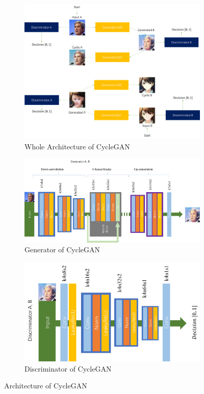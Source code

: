 \documentclass[10pt,twocolumn,letterpaper]{article}
\begin{document}
\begin{figure}[h]
   \centering
   \begin{subfigure}{.32\linewidth}
      \centering
      \includegraphics[width=.9\linewidth]{cyclegan-arch}
      \caption{Whole Architecture of CycleGAN}
   \end{subfigure}
   \begin{subfigure}{.32\linewidth}
      \centering
      \includegraphics[width=.9\linewidth]{cyclegan-g}
      \caption{Generator of CycleGAN}
   \end{subfigure}
   \begin{subfigure}{.32\linewidth}
      \centering
      \includegraphics[width=.9\linewidth]{cyclegan-d}
      \caption{Discriminator of CycleGAN}
   \end{subfigure}
   \caption{Architecture of CycleGAN}
   \label{fig:cyclegan-arch}
\end{figure}
\end{document}

